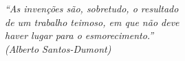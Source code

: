 \begin{epigrafe}
    \vspace*{\fill}
    \begin{flushright}
        \textit{``As invenções são, sobretudo, o resultado\\
        de um trabalho teimoso, em que não deve\\
        haver lugar para o esmorecimento.''\\
        (Alberto Santos-Dumont)}
    \end{flushright}
\end{epigrafe}
